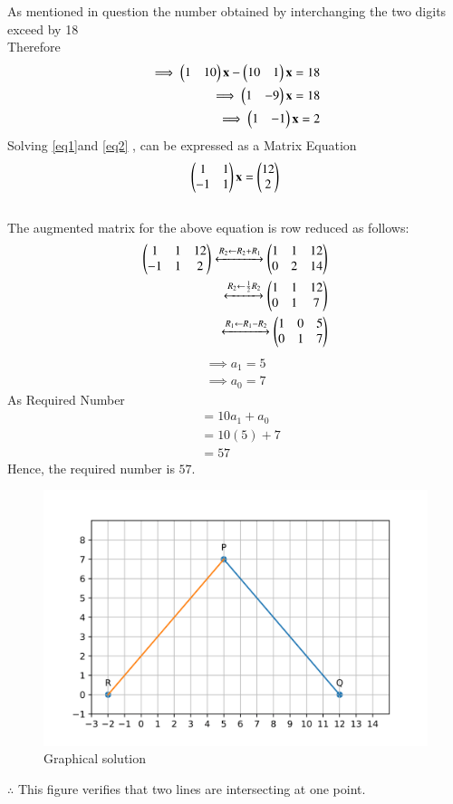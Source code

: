 \documentclass[journal,12pt,twocolumn]{IEEEtran}
\begin{document}
As mentioned in question the number obtained by interchanging the two digits exceed by 18\\
Therefore 
\begin{align}
  \implies\begin{pmatrix}1&10\end{pmatrix}\mathbf{x}-\begin{pmatrix}10&1\end{pmatrix}\mathbf{x}=18\\
   \implies\begin{pmatrix}1&-9\end{pmatrix}\mathbf{x}=18 \\ 
  \implies\begin{pmatrix}1&-1\end{pmatrix}\mathbf{x}=2\label{eq2}
\end{align}
 Solving  \eqref{eq1}and \eqref{eq2} , can be expressed as a Matrix Equation
 \begin{align}
    \begin{pmatrix}
    1 & 1 \\-1 & 1\end{pmatrix}\mathbf{x} = \begin{pmatrix}12\\2\end{pmatrix}
 \end{align}
 \\
The augmented matrix for the above equation
is row reduced as follows:
\begin{align}
\begin{pmatrix}1&1&12\\-1&1&2\end{pmatrix}\xleftrightarrow{R_2\leftarrow R_2+ R_1} \begin{pmatrix}1&1&12\\0&2&14\end{pmatrix}
\\
\xleftrightarrow{R_2\leftarrow \frac{1}{2}R_2} \begin{pmatrix}1&1&12 \\ 0&1&7\end{pmatrix}
\\
\xleftrightarrow{R_1 \leftarrow R_1-R_2}
\begin{pmatrix}1&0&5\\0&1&7\end{pmatrix}
\end{align}
 \begin{align}
 \implies {a_1}=5 \\
\implies {a_0}=7
 \end{align}  
 As Required Number 
    \begin{align}
        &=10 {a_1}+{a_0}\\
        &=10(5)+7\\
        &=57
    \end{align}
  Hence, the required number is $57$.
\begin{figure}[H]
    \includegraphics[width= \columnwidth]{Figure.png}
    \caption{Graphical solution}
    \label{Fig:Graphical Solution}
\end{figure}
$\therefore$ This figure verifies that two lines are intersecting at one point.
\end{document}
